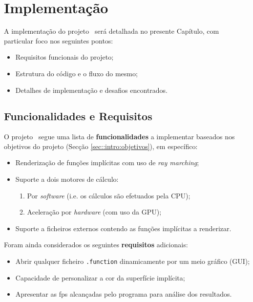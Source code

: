 \chapter{Implementação}
\label{ch::impl}


A implementação do projeto \theapp~será detalhada no presente Capítulo, com particular foco nos seguintes pontos:

\begin{itemize}[nosep]
	\item Requisitos funcionais do projeto;
	\item Estrutura do código e o fluxo do mesmo;
	\item Detalhes de implementação e desafios encontrados.
\end{itemize}


\section{Funcionalidades e Requisitos}
\label{sec::impl:requisitos}

O projeto \theapp~segue uma lista de \textbf{funcionalidades} a implementar baseados nos objetivos do projeto (Secção \ref{sec::intro:objetivos}), em específico:

\begin{itemize}
    \item Renderização de funções implícitas com uso de \textit{ray marching};
    \item Suporte a dois motores de cálculo:
    \begin{enumerate}[nosep]
        \item Por \textit{software} (i.e. os cálculos são efetuados pela \ac{CPU});
        \item Aceleração por \textit{hardware} (com uso da \ac{GPU});
    \end{enumerate}
    \item Suporte a ficheiros externos contendo as funções implícitas a renderizar.
\end{itemize}

Foram ainda considerados os seguintes \textbf{requisitos} adicionais:
\begin{itemize}
    \item Abrir qualquer ficheiro \verb|.function| dinamicamente por um meio gráfico (\ac{GUI});
    \item Capacidade de personalizar a cor da superfície implícita;
    \item Apresentar as \ac{fps} alcançadas pelo programa para análise dos resultados.
\end{itemize}


